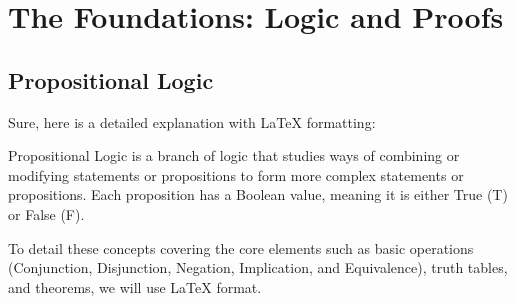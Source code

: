 \section{The Foundations: Logic and Proofs}
\subsection{Propositional Logic}
Sure, here is a detailed explanation with LaTeX formatting:

Propositional Logic is a branch of logic that studies ways of combining or modifying statements or propositions to form more complex statements or propositions. Each proposition has a Boolean value, meaning it is either True (T) or False (F).

To detail these concepts covering the core elements such as basic operations (Conjunction, Disjunction, Negation, Implication, and Equivalence), truth tables, and theorems, we will use LaTeX format.

